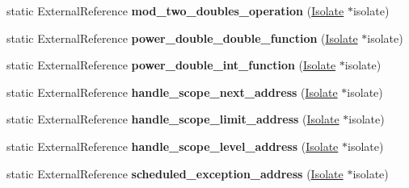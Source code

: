 \begin{DoxyCompactItemize}
\item 
static External\+Reference {\bfseries mod\+\_\+two\+\_\+doubles\+\_\+operation} (\hyperlink{classv8_1_1internal_1_1_isolate}{Isolate} $\ast$isolate)\hypertarget{classv8_1_1internal_1_1_b_a_s_e___e_m_b_e_d_d_e_d_a53d2ade385345760843f26f38f30d6eb}{}\label{classv8_1_1internal_1_1_b_a_s_e___e_m_b_e_d_d_e_d_a53d2ade385345760843f26f38f30d6eb}

\item 
static External\+Reference {\bfseries power\+\_\+double\+\_\+double\+\_\+function} (\hyperlink{classv8_1_1internal_1_1_isolate}{Isolate} $\ast$isolate)\hypertarget{classv8_1_1internal_1_1_b_a_s_e___e_m_b_e_d_d_e_d_a69106745f65206f1609e8615485691e6}{}\label{classv8_1_1internal_1_1_b_a_s_e___e_m_b_e_d_d_e_d_a69106745f65206f1609e8615485691e6}

\item 
static External\+Reference {\bfseries power\+\_\+double\+\_\+int\+\_\+function} (\hyperlink{classv8_1_1internal_1_1_isolate}{Isolate} $\ast$isolate)\hypertarget{classv8_1_1internal_1_1_b_a_s_e___e_m_b_e_d_d_e_d_ab091a27b3a2c285b5f841bec46775c74}{}\label{classv8_1_1internal_1_1_b_a_s_e___e_m_b_e_d_d_e_d_ab091a27b3a2c285b5f841bec46775c74}

\item 
static External\+Reference {\bfseries handle\+\_\+scope\+\_\+next\+\_\+address} (\hyperlink{classv8_1_1internal_1_1_isolate}{Isolate} $\ast$isolate)\hypertarget{classv8_1_1internal_1_1_b_a_s_e___e_m_b_e_d_d_e_d_a9add3748bfd032cdd2ba0335fb9f2347}{}\label{classv8_1_1internal_1_1_b_a_s_e___e_m_b_e_d_d_e_d_a9add3748bfd032cdd2ba0335fb9f2347}

\item 
static External\+Reference {\bfseries handle\+\_\+scope\+\_\+limit\+\_\+address} (\hyperlink{classv8_1_1internal_1_1_isolate}{Isolate} $\ast$isolate)\hypertarget{classv8_1_1internal_1_1_b_a_s_e___e_m_b_e_d_d_e_d_acfce4976eccf51d5369e8c1c72a38d24}{}\label{classv8_1_1internal_1_1_b_a_s_e___e_m_b_e_d_d_e_d_acfce4976eccf51d5369e8c1c72a38d24}

\item 
static External\+Reference {\bfseries handle\+\_\+scope\+\_\+level\+\_\+address} (\hyperlink{classv8_1_1internal_1_1_isolate}{Isolate} $\ast$isolate)\hypertarget{classv8_1_1internal_1_1_b_a_s_e___e_m_b_e_d_d_e_d_acf32e7d2cff163a49fc6a6fd42ad4fe5}{}\label{classv8_1_1internal_1_1_b_a_s_e___e_m_b_e_d_d_e_d_acf32e7d2cff163a49fc6a6fd42ad4fe5}

\item 
static External\+Reference {\bfseries scheduled\+\_\+exception\+\_\+address} (\hyperlink{classv8_1_1internal_1_1_isolate}{Isolate} $\ast$isolate)\hypertarget{classv8_1_1internal_1_1_b_a_s_e___e_m_b_e_d_d_e_d_ad154f5cc4831f45bc4a7c7670a760769}{}\label{classv8_1_1internal_1_1_b_a_s_e___e_m_b_e_d_d_e_d_ad154f5cc4831f45bc4a7c7670a760769}


\end{DoxyCompactItemize}
